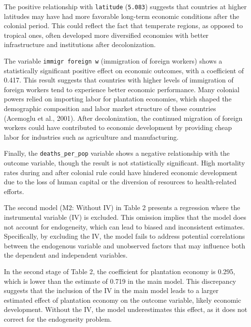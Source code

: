 \documentclass[12pt]{article}
\begin{document}
\noindent The positive relationship with \texttt{latitude} (\texttt{5.083}) suggests that countries at higher latitudes may have had more favorable long-term economic conditions after the colonial period. This could reflect the fact that temperate regions, as opposed to tropical ones, often developed more diversified economies with better infrastructure and institutions after decolonization.

\noindent The variable \texttt{immigr foreign w} (immigration of foreign workers) shows a statistically significant positive effect on economic outcomes, with a coefficient of 0.417. This result suggests that countries with higher levels of immigration of foreign workers tend to experience better economic performance.
Many colonial powers relied on importing labor for plantation economies, which shaped the demographic composition and labor market structure of these countries (Acemoglu et al., 2001). After decolonization, the continued migration of foreign workers could have contributed to economic development by providing cheap labor for industries such as agriculture and manufacturing.

\noindent Finally, the \texttt{deaths\_per\_pop} variable shows a negative relationship with the outcome variable, though the result is not statistically significant. High mortality rates during and after colonial rule could have hindered economic development due to the loss of human capital or the diversion of resources to health-related efforts.

\vspace{0.3 in} 

\noindent The second model (M2: Without IV) in Table 2 presents a regression where the instrumental variable (IV) is excluded. This omission implies that the model does not account for endogeneity, which can lead to biased and inconsistent estimates. Specifically, by excluding the IV, the model fails to address potential correlations between the endogenous variable and unobserved factors that may influence both the dependent and independent variables.

\noindent In the second stage of Table 2, the coefficient for plantation economy is 0.295, which is lower than the estimate of 0.719 in the main model. This discrepancy suggests that the inclusion of the IV in the main model leads to a larger estimated effect of plantation economy on the outcome variable, likely economic development. Without the IV, the model underestimates this effect, as it does not correct for the endogeneity problem.
\end{document}
